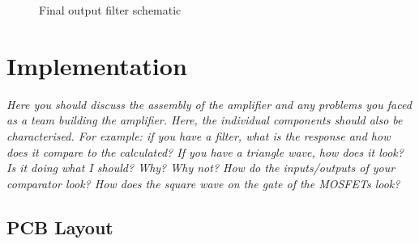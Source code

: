 \documentclass[11pt]{article}
\begin{document}
{\begin{figure}[h!]
  \centering
  \caption{Final output filter schematic}
\end{figure}


\section{Implementation}
 
\textit{Here you should discuss the assembly of the amplifier and any problems you faced as a team building the amplifier.
Here, the individual components should also be characterised. For example: if you have a filter, what is the response and how does it compare to the calculated? If you have a triangle wave, how does it look? Is it doing what I should? Why? Why not? How do the inputs/outputs of your comparator look? How does the square wave on the gate of the MOSFETs look?}
 

\subsection{PCB Layout}

}
\end{document}
